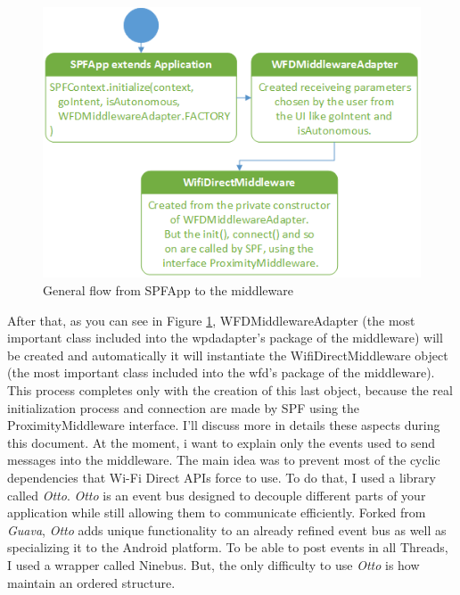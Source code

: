 \begin{figure}[thpb]
	\centering
	\includegraphics[scale=0.5]{./images/chap2/uml-parte0-1.png}
	\caption{General flow from SPFApp to the middleware}
	\label{uml-part0-1}
\end{figure}	

After that, as you can see in Figure \ref{uml-part0-1}, \textsf{WFDMiddlewareAdapter} (the most important class included into the \textsf{wpdadapter}'s package of the middleware) will be created and automatically it will instantiate the \textsf{WifiDirectMiddleware} object (the most important class included into the \textsf{wfd}'s package of the middleware). This process completes only with the creation of this last object, because the real initialization process and connection are made by SPF using the \textsf{ProximityMiddleware} interface. I'll discuss more in details these aspects during this document.
At the moment, i want to explain only the events used to send messages into the middleware. The main idea was to prevent most of the cyclic dependencies that Wi-Fi Direct APIs force to use. To do that, I used a library called \emph{Otto}. 
\emph{Otto} is an event bus designed to decouple different parts of your application while still allowing them to communicate efficiently. Forked from \emph{Guava}, \emph{Otto} adds unique functionality to an already refined event bus as well as specializing it to the Android platform.
To be able to post events in all Threads, I used a wrapper called \textsf{Ninebus}. But, the only difficulty to use \emph{Otto} is how maintain an ordered structure. 

